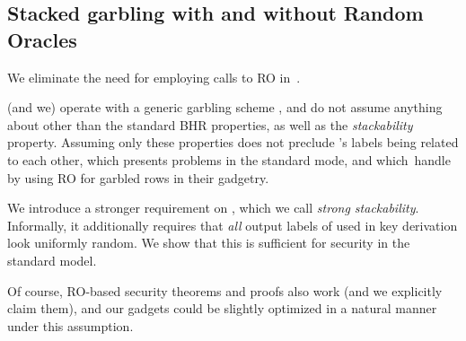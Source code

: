 \subsection{Stacked garbling with and without Random Oracles}
\label{sec:techOverviewRO}


We eliminate the need for employing calls to RO in~\HK.   

\HK (and we) operate with a generic garbling scheme \underscheme, and do not assume anything about \underscheme other than the standard BHR properties, as well as the {\em stackability} property.  Assuming only  these properties does not preclude \underscheme's labels being related to each other, which presents problems in the standard mode, and which~\HK handle by using RO for garbled rows in their gadgetry.

We introduce a stronger requirement on \underscheme, which we call {\em strong stackability}.  Informally, it additionally requires that {\em all} output labels of \underscheme used in key derivation look uniformly random.  We show that this is sufficient for security in the standard model.

Of course, RO-based security theorems and proofs also work (and we explicitly claim them), and our gadgets could be slightly optimized in a natural manner under this assumption.





